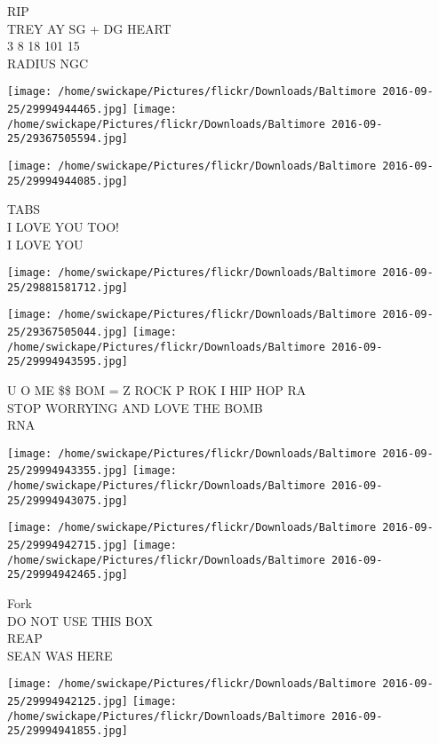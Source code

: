 \documentclass[10pt,letterpaper]{article}
\begin{document}
RIP\\
TREY AY SG + DG HEART\\
3 8 18 101 15\\
RADIUS NGC\\
\pagebreak

\texttt{[image: /home/swickape/Pictures/flickr/Downloads/Baltimore 2016-09-25/29994944465.jpg]}
\texttt{[image: /home/swickape/Pictures/flickr/Downloads/Baltimore 2016-09-25/29367505594.jpg]}

\vspace{0.25in}
\texttt{[image: /home/swickape/Pictures/flickr/Downloads/Baltimore 2016-09-25/29994944085.jpg]}

TABS\\
I LOVE YOU TOO!\\
I LOVE YOU\\
\pagebreak

\texttt{[image: /home/swickape/Pictures/flickr/Downloads/Baltimore 2016-09-25/29881581712.jpg]}

\vspace{0.25in}
\texttt{[image: /home/swickape/Pictures/flickr/Downloads/Baltimore 2016-09-25/29367505044.jpg]}
\texttt{[image: /home/swickape/Pictures/flickr/Downloads/Baltimore 2016-09-25/29994943595.jpg]}

U O ME \$\$ BOM = Z ROCK P ROK I HIP HOP RA\\
STOP WORRYING AND LOVE THE BOMB\\
RNA\\
\pagebreak

\texttt{[image: /home/swickape/Pictures/flickr/Downloads/Baltimore 2016-09-25/29994943355.jpg]}
\texttt{[image: /home/swickape/Pictures/flickr/Downloads/Baltimore 2016-09-25/29994943075.jpg]}

\texttt{[image: /home/swickape/Pictures/flickr/Downloads/Baltimore 2016-09-25/29994942715.jpg]}
\texttt{[image: /home/swickape/Pictures/flickr/Downloads/Baltimore 2016-09-25/29994942465.jpg]}

Fork\\
DO NOT USE THIS BOX\\
REAP\\
SEAN WAS HERE\\
\pagebreak

\texttt{[image: /home/swickape/Pictures/flickr/Downloads/Baltimore 2016-09-25/29994942125.jpg]}
\texttt{[image: /home/swickape/Pictures/flickr/Downloads/Baltimore 2016-09-25/29994941855.jpg]}
\end{document}
